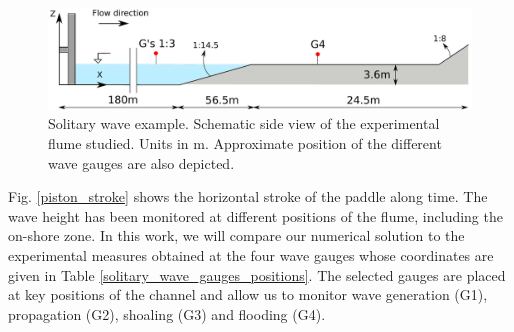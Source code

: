 \begin{figure} [htb]
    \centering
    \includegraphics[width=\textwidth]{img/coupling/solitary_wave_channel.pdf}
    \caption{Solitary wave example. Schematic side view of the experimental flume studied. Units in m. Approximate position of the different wave gauges are also depicted.}
    \label{solitary_wave_channel}
\end{figure}

Fig. \ref{piston_stroke} shows the horizontal stroke of the paddle along time. The wave height has been monitored at different positions of the flume, including the on-shore zone. In this work, we will compare our numerical solution to the experimental measures obtained at the four wave gauges whose coordinates are given in Table \ref{solitary_wave_gauges_positions}. The selected gauges are placed at key positions of the channel and allow us to monitor wave generation (G1), propagation (G2), shoaling (G3) and flooding (G4).


